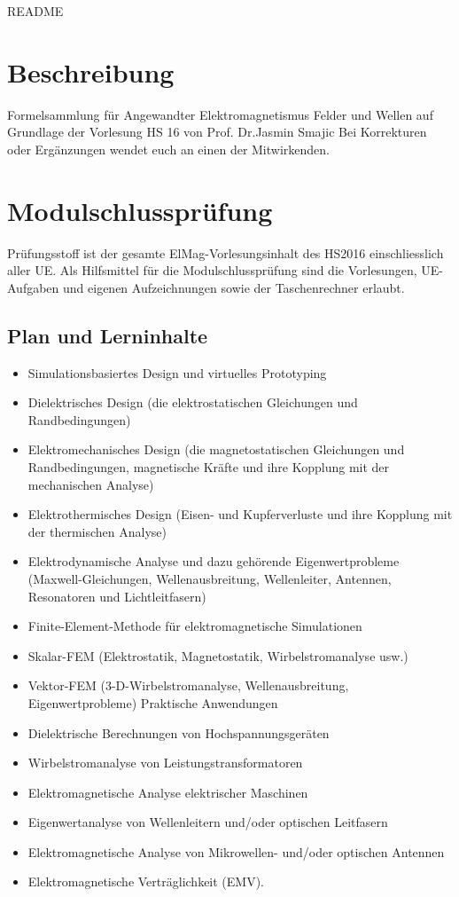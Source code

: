 \thispagestyle{empty}
\setcounter{page}{0} %
{\huge README }
\section*{Beschreibung}
Formelsammlung für Angewandter Elektromagnetismus Felder und Wellen auf Grundlage der Vorlesung HS 16 von Prof. Dr.Jasmin Smajic \newline
Bei Korrekturen oder Ergänzungen wendet euch an einen der Mitwirkenden.

\section*{Modulschlussprüfung}
Prüfungsstoff ist der gesamte ElMag-Vorlesungsinhalt des HS2016 einschliesslich aller UE.\newline
Als Hilfsmittel für die Modulschlussprüfung sind die Vorlesungen,\newline
UE-Aufgaben und eigenen Aufzeichnungen sowie der Taschenrechner erlaubt.

\subsection*{Plan und Lerninhalte}
{\scriptsize 
\begin{itemize}
    \item Simulationsbasiertes Design und virtuelles Prototyping 
	\item Dielektrisches Design (die elektrostatischen Gleichungen und Randbedingungen)
	\item Elektromechanisches Design (die magnetostatischen Gleichungen und Randbedingungen,  magnetische Kräfte und ihre Kopplung mit der mechanischen Analyse)
	\item Elektrothermisches Design (Eisen- und Kupferverluste und ihre Kopplung mit der thermischen Analyse)
	\item Elektrodynamische Analyse und dazu gehörende Eigenwertprobleme (Maxwell-Gleichungen, Wellenausbreitung, Wellenleiter, Antennen, Resonatoren und Lichtleitfasern) 
	\item Finite-Element-Methode für elektromagnetische Simulationen 
	\item Skalar-FEM (Elektrostatik, Magnetostatik, Wirbelstromanalyse usw.) 
	\item Vektor-FEM (3-D-Wirbelstromanalyse, Wellenausbreitung, Eigenwertprobleme)
	Praktische Anwendungen 
	\item Dielektrische Berechnungen von Hochspannungsgeräten
	\item Wirbelstromanalyse von Leistungstransformatoren
	\item Elektromagnetische Analyse elektrischer Maschinen
	\item Eigenwertanalyse von Wellenleitern und/oder optischen Leitfasern
\item Elektromagnetische Analyse von Mikrowellen- und/oder optischen Antennen
	\item Elektromagnetische Verträglichkeit (EMV).
\end{itemize}
}
\vfill
